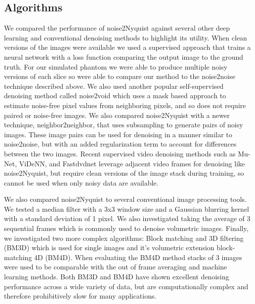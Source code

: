 \documentclass[12pt]{spieman}
\begin{document}
\begin{spacing}{2}
\subsection{Algorithms}
We compared the performance of noise2Nyquist against several other deep learning and conventional denoising methods to highlight its utility. When clean versions of the images were available we used a supervised approach that trains a neural network with a loss function comparing the output image to the ground truth. For our simulated phantom we were able to produce multiple noisy versions of each slice so were able to compare our method to the noise2noise technique described above. We also used another popular self-supervised denoising method called noise2void\cite{Krull2019} which uses a mask based approach to estimate noise-free pixel values from neighboring pixels, and so does not require paired or noise-free images. We also compared noise2Nyquist with a newer technique, neighbor2neighbor, that uses subsampling to generate pairs of noisy images\cite{Huang2021b}. These image pairs can be used for denoising in a manner similar to noise2noise, but with an added regularization term to account for differences between the two images. Recent supervised video denoising methods such as Mu-Net\cite{Lee2020a}, ViDeNN\cite{Claus2019}, and Fastdvdnet\cite{Tassano2020} leverage adjacent video frames for denoising like noise2Nyquist, but require clean versions of the image stack during training, so cannot be used when only noisy data are available.

We also compared noise2Nyquist to several conventional image processing tools. We tested a median filter with a 3x3 window size and a Gaussian blurring kernel with a standard deviation of 1 pixel. We also investigated taking the average of 3 sequential frames which is commonly used to denoise volumetric images. Finally, we investigated two more complex algorithms: Block matching and 3D filtering (BM3D) which is used for single images\cite{Dabov2007} and it's volumetric extension block-matching 4D (BM4D)\cite{Maggioni2013}. When evaluating the BM4D method stacks of 3 images were used to be comparable with the out of frame averaging and machine learning methods. Both BM3D and BM4D have shown excellent denoising performance across a wide variety of data, but are computationally complex and therefore prohibitively slow for many applications.


\end{spacing}
\end{document}
